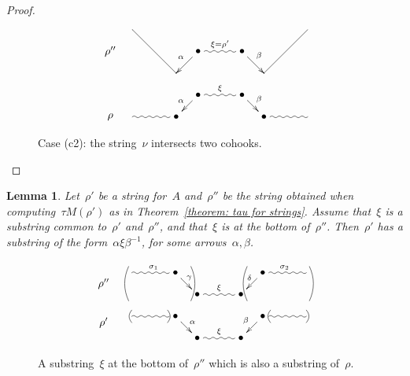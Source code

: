 \documentclass{memo-l}
\newtheorem{lemma}[theorem]{Lemma}
\theoremstyle{definition}
\begin{document}
\begin{proof}
\begin{enumerate}[(a)]
\begin{enumerate}[(c1)]
\begin{figure}[h]
 	\capstart
\[
\xy
%
(-35,7)*+{\rho''};
(-28,14)="lpeak";
(-14,0)="-12";
(-7,7)*+{\bullet}="-11";
(7,7)*+{\bullet}="11";
(14,0)="12";
(28,14)="rpeak";
%
(-35,-14)*+{\rho};
(-28,-14)="-4";
(-14,-14)*+{\bullet}="-2";
(-7,-7)*+{\bullet}="-1";
(7,-7)*+{\bullet}="1";
(14,-14)*+{\bullet}="2";
(28,-14)="4";
%
{\ar@{-} "lpeak";"-12"};
{\ar_{\alpha} "-11";"-12"};
{\ar@{~}^{\xi=\rho'} "-11";"11"};
{\ar^{\beta} "11";"12"};
{\ar@{-} "12";"rpeak"};
%
{\ar@{~} "-4";"-2"};
{\ar_{\alpha} "-1";"-2"};
{\ar@{~}^\xi "-1";"1"};
{\ar^\beta "1";"2"};
{\ar@{~} "2";"4"};
%
\endxy
\]
    \caption{Case (c2): the string~$\nu$ intersects two cohooks.}
    \vspace{-.5cm}
    \label{fig: not tau compatible case c2}
\end{figure}
%
\qedhere
\end{enumerate}
\end{enumerate}
\end{proof}

\begin{lemma}\label{lemma: xi equals nu}
Let~$\rho'$ be a string for~$A$ and~$\rho''$ be the string obtained when computing~$\tau M(\rho')$ as in Theorem~\ref{theorem: tau for strings}.
Assume that~$\xi$ is a substring common to~$\rho'$ and~$\rho''$, and that~$\xi$ is at the bottom of~$\rho''$.
Then~$\rho'$ has a substring of the form~$\alpha\xi\beta^{-1}$, for some arrows~$\alpha, \beta$.
\end{lemma}

\begin{figure}[h]
 	\capstart
\[
\xy
%
(-37,10.5)*+{\rho''};
(-28,14)="-14";
(-14,14)*+{\bullet}="-12";
(-7,7)*+{\bullet}="-11";
(7,7)*+{\bullet}="11";
(14,14)*+{\bullet}="12";
(28,14)="14";
%
{\ar@{~}^{\sigma_1} "-14";"-12"};
{\ar^{\!\!\gamma} "-12";"-11"};
{\ar@{~}^{\xi} "-11";"11"};
{\ar_{\delta\!\!} "12";"11"};
{\ar@{~}^{\sigma_2} "12";"14"};
%
{\ar@/^.3pc/@{-} (-29,5);(-29,16)};
{\ar@/_.3pc/@{-} (-9,5);(-9,16)};
%
{\ar@/^.3pc/@{-} (9,5);(9,16)};
{\ar@/_.3pc/@{-} (29,5);(29,16)};
%
%
%
(-37,-2)*+{\rho'};
(-28,0)="-4";
(-14,0)*+{\bullet}="-2";
(-7,-7)*+{\bullet}="-1";
(7,-7)*+{\bullet}="1";
(14,0)*+{\bullet}="2";
(28,0)="4";
%
{\ar@{~} "-4";"-2"};
{\ar^{\alpha} "-2";"-1"};
{\ar@{~}^{\xi} "-1";"1"};
{\ar_{\beta} "2";"1"};
{\ar@{~} "2";"4"};
%
{\ar@/^.2pc/@{-} (-28,-2);(-28,2)};
{\ar@/_.2pc/@{-} (-16.5,-2);(-16.5,2)};
%
{\ar@/_.2pc/@{-} (28,-2);(28,2)};
{\ar@/^.2pc/@{-} (16.5,-2);(16.5,2)};
%
\endxy
\]
    \caption{A substring~$\xi$ at the bottom of~$\rho''$ which is also a substring of~$\rho$.}
    \vspace{-.5cm}
    \label{fig: xi equals nu}
\end{figure}
\end{document}
